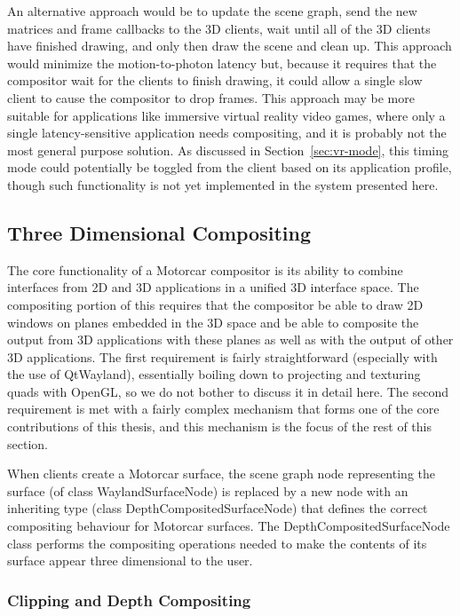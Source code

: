 An alternative approach would be to update the scene graph, send the new matrices and frame callbacks to the 3D clients, wait until all of the 3D clients have finished drawing, and only then draw the scene and clean up. This approach would minimize the motion-to-photon latency but, because it requires that the compositor wait for the clients to finish drawing, it could allow a single slow client to cause the compositor to drop frames. This approach may be more suitable for applications like immersive virtual reality video games, where only a single latency-sensitive application needs compositing, and it is probably not the most general purpose solution. As discussed in Section~\ref{sec:vr-mode}, this timing mode could potentially be toggled from the client based on its application profile, though such functionality is not yet implemented in the system presented here.

\subsection{Three Dimensional Compositing}
\label{sec:3d-compositing}

The core functionality of a Motorcar compositor is its ability to combine interfaces from 2D and 3D applications in a unified 3D interface space. The compositing portion of this requires that the compositor be able to draw 2D windows on planes embedded in the 3D space and be able to composite the output from 3D applications with these planes as well as with the output of other 3D applications. The first requirement is fairly straightforward (especially with the use of QtWayland), essentially boiling down to projecting and texturing quads with OpenGL, so we do not bother to discuss it in detail here. The second requirement is met with a fairly complex mechanism that forms one of the core contributions of this thesis, and this mechanism is the focus of the rest of this section.

When clients create a Motorcar surface, the scene graph node representing the surface (of class WaylandSurfaceNode) is replaced by a new node with an inheriting type (class DepthCompositedSurfaceNode)  that defines the correct compositing behaviour for Motorcar surfaces. The DepthCompositedSurfaceNode class performs the compositing operations needed to make the contents of its surface appear three dimensional to the user.

\subsubsection{Clipping and Depth Compositing}
\label{sec:clipping-impl}


